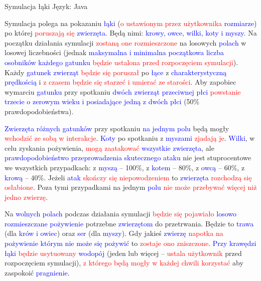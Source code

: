 \documentclass{article}
\begin{document}
{\Large Symulacja łąki}\newline
Język: Java

Symulacja polega na pokazaniu \textcolor{blue}{łąki} (\textcolor{red}{o ustawionym przez użytkownika} \textcolor{blue}{rozmiarze}) po której \textcolor{red}{poruszają się} \textcolor{blue}{zwierzęta}. Będą nimi: \textcolor{blue}{krowy, owce, wilki, koty i myszy.} Na początku działania symulacji \textcolor{red}{zostaną one rozmieszczone} na losowych \textcolor{blue}{polach} w losowej liczebności (jednak \textcolor{blue}{maksymalna i minimalna początkowa liczba osobników każdego gatunku} \textcolor{red}{będzie ustalona przed rozpoczęciem symulacji}). Każdy \textcolor{blue}{gatunek zwierząt} \textcolor{red}{będzie się poruszał} po \textcolor{blue}{łące}
z \textcolor{blue}{charakterystyczną prędkością} i \textcolor{red}{z czasem będzie się starzeć i umierać ze starości}. Aby zapobiec wymarciu \textcolor{blue}{gatunku} przy spotkaniu \textcolor{blue}{dwóch zwierząt przeciwnej płci} \textcolor{red}{powstanie} \textcolor{blue}{trzecie 
o zerowym wieku i posiadające jedną z dwóch płci} (50\% prawdopodobieństwa).

\textcolor{blue}{Zwierzęta różnych gatunków} przy spotkaniu \textcolor{blue}{na jednym polu} będą mogły \textcolor{red}{wchodzić ze sobą w interakcje}. \textcolor{blue}{Koty} po spotkaniu z \textcolor{blue}{myszami} \textcolor{red}{zjadają je}. \textcolor{blue}{Wilki}, w celu zyskania pożywienia, \textcolor{red}{mogą zaatakować} \textcolor{blue}{wszystkie zwierzęta}, ale \textcolor{blue}{prawdopodobieństwo przeprowadzenia skutecznego ataku} nie jest stuprocentowe we wszystkich przypadkach: z \textcolor{blue}{myszą} – 100\%, 
z \textcolor{blue}{kotem} – 80\%, z \textcolor{blue}{owcą} – 60\%, z \textcolor{blue}{krową} – 40\%. Jeżeli \textcolor{blue}{atak} \textcolor{red}{skończy się niepowodzeniem} to \textcolor{blue}{zwierzęta} \textcolor{red}{rozchodzą się osłabione}. Poza tymi przypadkami na jednym \textcolor{blue}{polu} \textcolor{red}{nie może przebywać więcej niż jedno zwierzę}.

Na \textcolor{blue}{wolnych polach} podczas działania symulacji \textcolor{red}{ będzie się pojawiało} \textcolor{blue}{losowo rozmieszczane pożywienie} potrzebne \textcolor{blue}{zwierzętom} do przetrwania. Będzie to \textcolor{blue}{trawa} (dla \textcolor{blue}{krów 
i owiec}) oraz \textcolor{blue}{ser} (dla \textcolor{blue}{myszy}). Gdy jakieś \textcolor{blue}{zwierzę} \textcolor{red}{napotka na} \textcolor{blue}{pożywienie którym nie może się pożywić} to \textcolor{red}{zostaje ono zniszczone}. \textcolor{blue}{Przy krawędzi łąki} \textcolor{red}{będzie usytuowany} \textcolor{blue}{wodopój} (jeden lub więcej – \textcolor{red}{ustala użytkownik} przed rozpoczęciem symulacji), \textcolor{red}{z którego będą mogły w każdej chwili korzystać} aby zaspokoić \textcolor{blue}{pragnienie}. 
\end{document}
